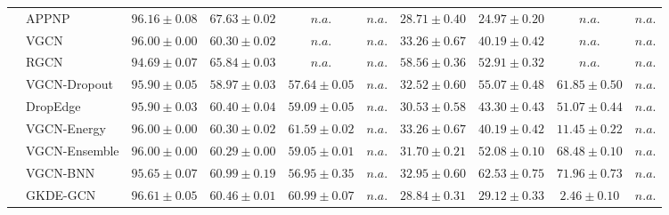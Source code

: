 \begin{table*}[!h]
{\begin{tabular}{ll|cccc|cccc}
        & APPNP & ${96.16\scriptscriptstyle \pm 0.08}$ & ${67.63\scriptscriptstyle \pm 0.02}$ & $n.a.$ & $n.a.$ & ${28.71\scriptscriptstyle \pm 0.40}$ & ${24.97\scriptscriptstyle \pm 0.20}$ & $n.a.$ & $n.a.$\\
        & VGCN & ${96.00\scriptscriptstyle \pm 0.00}$ & ${60.30\scriptscriptstyle \pm 0.02}$ & $n.a.$ & $n.a.$ & ${33.26\scriptscriptstyle \pm 0.67}$ & ${40.19\scriptscriptstyle \pm 0.42}$ & $n.a.$ & $n.a.$\\
        & RGCN & ${94.69\scriptscriptstyle \pm 0.07}$ & ${65.84\scriptscriptstyle \pm 0.03}$ & $n.a.$ & $n.a.$ & ${58.56\scriptscriptstyle \pm 0.36}$ & ${52.91\scriptscriptstyle \pm 0.32}$ & $n.a.$ & $n.a.$\\
        & VGCN-Dropout & ${95.90\scriptscriptstyle \pm 0.05}$ & ${58.97\scriptscriptstyle \pm 0.03}$ & ${57.64\scriptscriptstyle \pm 0.05}$ & $n.a.$ & ${32.52\scriptscriptstyle \pm 0.60}$ & ${55.07\scriptscriptstyle \pm 0.48}$ & ${61.85\scriptscriptstyle \pm 0.50}$ & $n.a.$\\
        & DropEdge & ${95.90\scriptscriptstyle \pm 0.03}$ & ${60.40\scriptscriptstyle \pm 0.04}$ & ${59.09\scriptscriptstyle \pm 0.05}$ & $n.a.$ & ${30.53\scriptscriptstyle \pm 0.58}$ & ${43.30\scriptscriptstyle \pm 0.43}$ & ${51.07\scriptscriptstyle \pm 0.44}$ & $n.a.$\\
        & VGCN-Energy & ${96.00\scriptscriptstyle \pm 0.00}$ & ${60.30\scriptscriptstyle \pm 0.02}$ & ${61.59\scriptscriptstyle \pm 0.02}$ & $n.a.$ & ${33.26\scriptscriptstyle \pm 0.67}$ & ${40.19\scriptscriptstyle \pm 0.42}$ & ${11.45\scriptscriptstyle \pm 0.22}$ & $n.a.$\\
        & VGCN-Ensemble & ${96.00\scriptscriptstyle \pm 0.00}$ & ${60.29\scriptscriptstyle \pm 0.00}$ & ${59.05\scriptscriptstyle \pm 0.01}$ & $n.a.$ & ${31.70\scriptscriptstyle \pm 0.21}$ & ${52.08\scriptscriptstyle \pm 0.10}$ & ${68.48\scriptscriptstyle \pm 0.10}$ & $n.a.$\\
        & VGCN-BNN & ${95.65\scriptscriptstyle \pm 0.07}$ & ${60.99\scriptscriptstyle \pm 0.19}$ & ${56.95\scriptscriptstyle \pm 0.35}$ & $n.a.$ & ${32.95\scriptscriptstyle \pm 0.60}$ & ${62.53\scriptscriptstyle \pm 0.75}$ & ${{71.96}\scriptscriptstyle \pm 0.73}$ & $n.a.$\\
        & GKDE-GCN & ${\mathbf{96.61}\scriptscriptstyle \pm 0.05}$ & ${60.46\scriptscriptstyle \pm 0.01}$ & ${60.99\scriptscriptstyle \pm 0.07}$ & $n.a.$ & ${28.84\scriptscriptstyle \pm 0.31}$ & ${29.12\scriptscriptstyle \pm 0.33}$ & ${2.46\scriptscriptstyle \pm 0.10}$ & $n.a.$\\

\end{tabular}}
\end{table*}
